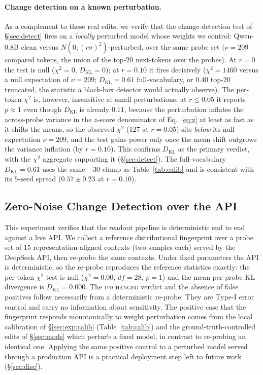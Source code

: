 \documentclass[11pt]{article}
\theoremstyle{definition}
\begin{document}
\paragraph{Change detection on a known perturbation.}
As a complement to these real edits, we verify that the change-detection test
of \S\ref{sec:detect} fires on a \emph{locally} perturbed model whose weights
we control:
Qwen-0.8B clean versus $N(0,(r\sigma)^2)$-perturbed, over the same probe set
($\nu = 209$ compared tokens, the union of the top-$20$ next-tokens over the
probes). At $r = 0$ the test is null ($\chi^2 = 0$, $D_{\mathrm{KL}} = 0$); at
$r = 0.10$ it fires decisively ($\chi^2 = 1460$ versus a null expectation of
$\nu = 209$; $D_{\mathrm{KL}} = 0.61$ full-vocabulary, or $0.40$ top-$20$
truncated, the statistic a black-box detector would actually observe). The
per-token $\chi^2$ is, however, insensitive at small perturbations: at
$r \le 0.05$ it reports $p \approx 1$ even though $D_{\mathrm{KL}}$ is already
$0.11$, because the perturbation inflates the across-probe variance in the
$z$-score denominator of Eq.~\eqref{eq:z} at least as fast as it shifts the
means, so the observed $\chi^2$ ($127$ at $r = 0.05$) sits \emph{below} its null
expectation $\nu = 209$, and the test gains power only once
the mean shift outgrows the variance inflation (by $r = 0.10$). This confirms $D_{\mathrm{KL}}$ as
the primary verdict, with the $\chi^2$ aggregate supporting it (\S\ref{sec:detect}). The
full-vocabulary $D_{\mathrm{KL}} = 0.61$ uses the same $-30$ clamp as
Table~\ref{tab:calib} and is consistent with its $5$-seed spread
($0.57 \pm 0.23$ at $r = 0.10$).

\subsection{Zero-Noise Change Detection over the API}
\label{sec:exp:api}

This experiment verifies that the readout pipeline is deterministic end to end
against a live API. We collect a reference distributional fingerprint over a
probe set of $15$ representation-aligned contexts (two samples each) served by
the DeepSeek API, then re-probe the same contexts. Under fixed parameters the
API is deterministic, so the re-probe reproduces the reference statistics
exactly: the per-token $\chi^2$ test is null ($\chi^2 = 0.00$, $df = 28$,
$p = 1$) and the mean per-probe KL divergence is $D_{\mathrm{KL}} = 0.000$. The
\textsc{unchanged} verdict and the absence of false positives follow
necessarily from a deterministic re-probe. They are Type-I error control and
carry no information about sensitivity. The positive case that the fingerprint
responds monotonically to weight perturbation comes from the local calibration
of \S\ref{sec:exp:calib} (Table~\ref{tab:calib}) and the ground-truth-controlled edits of \S\ref{sec:mods}
which perturb a fixed model, in contrast to re-probing an identical one.
Applying the same positive control to a perturbed model served through a
production API is a practical deployment step left to future work
(\S\ref{sec:disc}).
\end{document}
